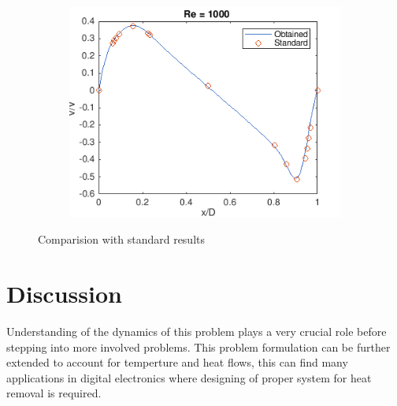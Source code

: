 \documentclass{article}
\begin{document}
\begin{figure}
\begin{subfigure}[b]{0.3\textwidth}
    \includegraphics[width=\textwidth]{43.png}
  \end{subfigure}
      \caption{Comparision with standard results}
\label{fig:res6s}
\end{figure}



\section{Discussion}
Understanding of the dynamics of this problem plays a very crucial role before stepping into more involved problems. This problem formulation can be further extended to account for temperture and heat flows, this can find many applications in digital electronics where designing of proper system for heat removal is required. 






\end{document}
